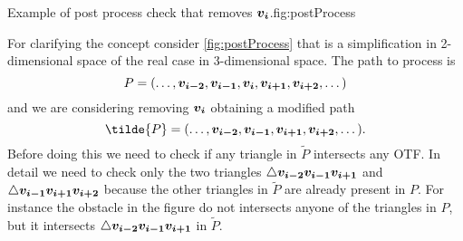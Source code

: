 \documentclass[dissertation.tex]{subfiles}
\begin{document}
\begin{myfig}{Example of post process check that removes $\boldsymbol{v_i}$.}{fig:postProcess}
\end{myfig}
For clarifying the concept consider \cref{fig:postProcess} that is a
simplification in 2-dimensional space of the real case in
3-dimensional space. The path to process
is
\begin{equation*}
  P=(\dots,\boldsymbol{v_{i-2}},\boldsymbol{v_{i-1}},\boldsymbol{v_{i}},\boldsymbol{v_{i+1}},\boldsymbol{v_{i+2}},\dots)
\end{equation*}
and we are
considering removing $\boldsymbol{v_i}$ obtaining a modified path
\begin{equation*}
  \tilde{P}=(\dots,\ve{v_{i-2}},\ve{v_{i-1}},\ve{v_{i+1}},\ve{v_{i+2}},\dots).
\end{equation*}
Before doing this we need to check if any triangle in $\tilde{P}$
intersects any \ac{OTF}. In detail we need to check only the two
triangles $\triangle\boldsymbol{v_{i-2}}\boldsymbol{v_{i-1}}\boldsymbol{v_{i+1}}$ and
$\triangle\boldsymbol{v_{i-1}}\boldsymbol{v_{i+1}}\boldsymbol{v_{i+2}}$ because the other
triangles in $\tilde{P}$ are already present in $P$. For instance
the obstacle in the figure do not intersects anyone of the triangles in
$P$, but it intersects $\triangle\boldsymbol{v_{i-2}}\boldsymbol{v_{i-1}}\boldsymbol{v_{i+1}}$ in
$\tilde{P}$.
\end{document}
